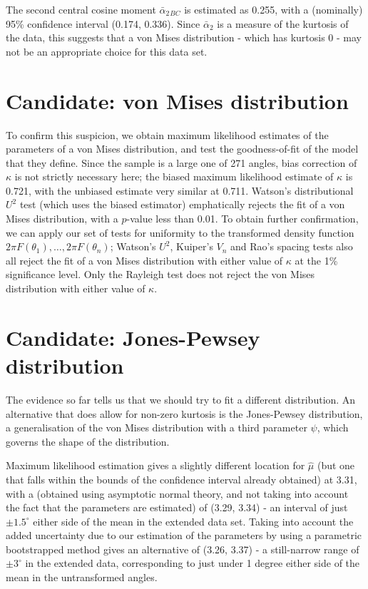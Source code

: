 \documentclass[12pt,fleqn]{article} %
\begin{document}
The second central cosine moment ${\bar{\alpha}_2}{}_{BC}$ is estimated as 0.255, with a (nominally) 95\% confidence interval (0.174, 0.336). Since $\bar{\alpha}_2$ is a measure of the kurtosis of the data, this suggests that a von Mises distribution - which has kurtosis 0 - may not be an appropriate choice for this data set. 

\section{Candidate: von Mises distribution}
To confirm this suspicion, we obtain maximum likelihood estimates of the parameters of a von Mises distribution, and test the goodness-of-fit of the model that they define. Since the sample is a large one of 271 angles, bias correction of $\kappa$ is not strictly necessary here; the biased maximum likelihood estimate of $\kappa$ is 0.721, with the unbiased estimate very similar at 0.711. Watson's distributional $U^2$ test (which uses the biased estimator) emphatically rejects the fit of a von Mises distribution, with a $p$-value less than 0.01. To obtain further confirmation, we can apply our set of tests for uniformity to the transformed density function $2\pi F(\theta_1), \dots, 2\pi F(\theta_n)$; Watson's $U^2$, Kuiper's $V_n$ and Rao's spacing tests also all reject the fit of a von Mises distribution with either value of $\kappa$ at the 1\% significance level. Only the Rayleigh test does not reject the von Mises distribution with either value of $\kappa$.


\section{Candidate: Jones-Pewsey distribution}
The evidence so far tells us that we should try to fit a different distribution. An alternative that does allow for non-zero kurtosis is the Jones-Pewsey distribution, a generalisation of the von Mises distribution with a third parameter $\psi$, which governs the shape of the distribution.

Maximum likelihood estimation gives a slightly different location for $\hat{\mu}$ (but one that falls within the bounds of the confidence interval already obtained) at 3.31, with a  (obtained using asymptotic normal theory, and not taking into account the fact that the parameters are estimated) of (3.29, 3.34) - an interval of just $\pm 1.5^\circ$ either side of the mean in the extended data set. Taking into account the added uncertainty due to our estimation of the parameters by using a parametric bootstrapped method gives an alternative  of (3.26, 3.37) - a still-narrow range of $\pm 3^\circ$ in the extended data, corresponding to just under 1 degree either side of the mean in the untransformed angles.
\end{document}

